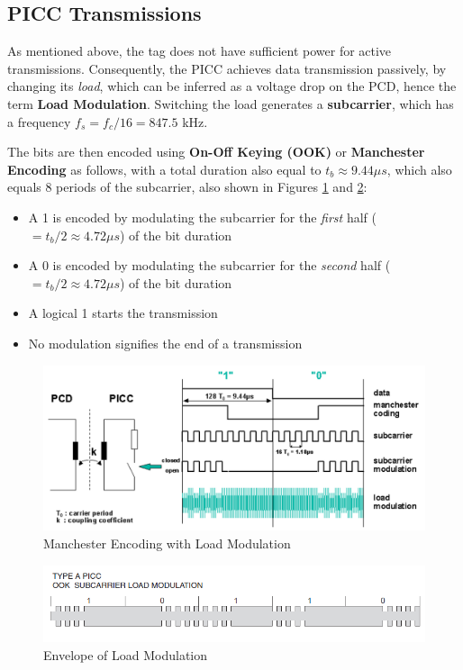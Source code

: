 \documentclass[fleqn,10pt]{SelfArx} %
\newcommand{\ms}{\ensuremath{\mu s} }
\begin{document}
\subsection{PICC Transmissions}
\label{subsec:picc}

As mentioned above, the tag does not have sufficient power for active transmissions. Consequently, the PICC achieves data transmission passively, by changing its {\em load}, which can be inferred as a voltage drop on the PCD, hence the term {\bf Load Modulation}. Switching the load generates a {\bf subcarrier}, which has a frequency $f_s=f_c/16=847.5$ kHz. 

The bits are then encoded using {\bf On-Off Keying (OOK)} or {\bf Manchester Encoding} as follows, with a total duration also equal to $t_b\approx9.44\ms$, which also equals 8 periods of the subcarrier, also shown in Figures \ref{fig:manchester} and \ref{fig:manchester2}:

\begin{itemize}[noitemsep] 
\item A 1 is encoded by modulating the subcarrier for the {\em first} half ($=t_b/2\approx4.72\ms$) of the bit duration
\item A 0  is encoded by modulating the subcarrier for the {\em second} half ($=t_b/2\approx4.72\ms$) of the bit duration
\item A logical 1 starts the transmission
\item No modulation signifies the end of a transmission
\end{itemize}


\begin{figure}[h]
  \includegraphics[width=\linewidth]{img/manchester2}
  \caption{Manchester Encoding with Load Modulation \cite{mifare}}
  \label{fig:manchester}
\end{figure}

\begin{figure}[h]
  \includegraphics[width=\linewidth]{img/manchester}
  \caption{Envelope of Load Modulation \cite{atmel}}
  \label{fig:manchester2}
\end{figure}
\end{document}
